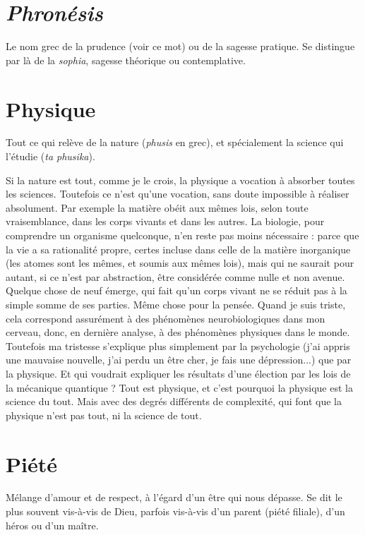 \section{{\it Phronésis}}
Le nom grec de la prudence (voir ce mot) ou de la sagesse pratique.
Se distingue par là de la {\it sophia}, sagesse théorique ou
contemplative.

\section{Physique}
Tout ce qui relève de la nature ({\it phusis} en grec), et spécialement
la science qui l’étudie ({\it ta phusika}).

Si la nature est tout, comme je le crois, la physique a vocation à absorber
toutes les sciences. Toutefois ce n’est qu’une vocation, sans doute impossible à
réaliser absolument. Par exemple la matière obéit aux mêmes lois, selon toute
vraisemblance, dans les corps vivants et dans les autres. La biologie, pour comprendre
un organisme quelconque, n’en reste pas moins nécessaire : parce que
la vie a sa rationalité propre, certes incluse dans celle de la matière inorganique
(les atomes sont les mêmes, et soumis aux mêmes lois), mais qui ne saurait pour
autant, si ce n’est par abstraction, être considérée comme nulle et non avenue.
Quelque chose de neuf émerge, qui fait qu’un corps vivant ne se réduit pas à la
simple somme de ses parties. Même chose pour la pensée. Quand je suis triste,
cela correspond assurément à des phénomènes neurobiologiques dans mon cerveau,
donc, en dernière analyse, à des phénomènes physiques dans le monde.
Toutefois ma tristesse s’explique plus simplement par la psychologie (j'ai appris
une mauvaise nouvelle, j'ai perdu un être cher, je fais une dépression...) que
par la physique. Et qui voudrait expliquer les résultats d’une élection par les lois
de la mécanique quantique ? Tout est physique, et c’est pourquoi la physique
est la science du tout. Mais avec des degrés différents de complexité, qui font
que la physique n’est pas tout, ni la science de tout.

\section{Piété}
Mélange d’amour et de respect, à l’égard d’un être qui nous dépasse.
Se dit le plus souvent vis-à-vis de Dieu, parfois vis-à-vis d’un parent
(piété filiale), d’un héros ou d’un maître.

